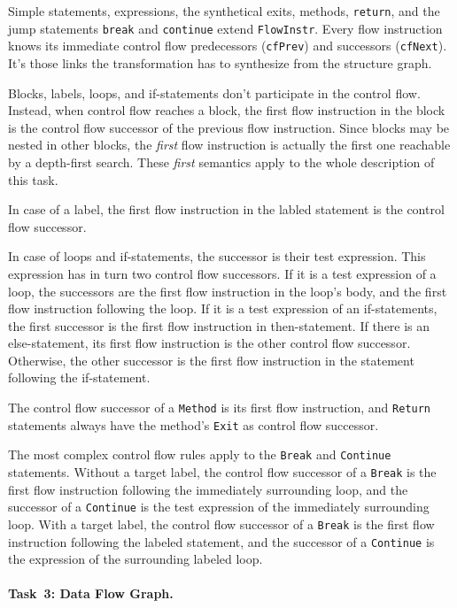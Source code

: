\documentclass[submission]{eptcs}
\begin{document}
Simple statements, expressions, the synthetical exits, methods, \verb|return|,
and the jump statements \verb|break| and \verb|continue| extend
\verb|FlowInstr|.  Every flow instruction knows its immediate control flow
predecessors (\verb|cfPrev|) and successors (\verb|cfNext|).  It's those links
the transformation has to synthesize from the structure graph.

Blocks, labels, loops, and if-statements don't participate in the control flow.
Instead, when control flow reaches a block, the first flow instruction in the
block is the control flow successor of the previous flow instruction.  Since
blocks may be nested in other blocks, the \emph{first} flow instruction is
actually the first one reachable by a depth-first search.  These \emph{first}
semantics apply to the whole description of this task.

In case of a label, the first flow instruction in the labled statement is the
control flow successor.

In case of loops and if-statements, the successor is their test expression.
This expression has in turn two control flow successors.  If it is a test
expression of a loop, the successors are the first flow instruction in the
loop's body, and the first flow instruction following the loop.  If it is a
test expression of an if-statements, the first successor is the first flow
instruction in then-statement.  If there is an else-statement, its first flow
instruction is the other control flow successor.  Otherwise, the other
successor is the first flow instruction in the statement following the
if-statement.

The control flow successor of a \verb|Method| is its first flow instruction,
and \verb|Return| statements always have the method's \verb|Exit| as control
flow successor.

The most complex control flow rules apply to the \verb|Break| and
\verb|Continue| statements.  Without a target label, the control flow successor
of a \verb|Break| is the first flow instruction following the immediately
surrounding loop, and the successor of a \verb|Continue| is the test expression
of the immediately surrounding loop.  With a target label, the control flow
successor of a \verb|Break| is the first flow instruction following the labeled
statement, and the successor of a \verb|Continue| is the expression of the
surrounding labeled loop.


\paragraph{Task~3: Data Flow Graph.}
\label{sec:task3-df-graph}
\end{document}
